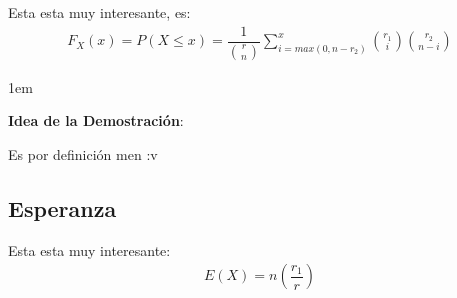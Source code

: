\documentclass[12pt, fleqn]{report}                             %
\newenvironment{SmallIndentation}[1][0.75em]                    %
        {\begin{adjustwidth}{#1}{}\begin{footnotesize}}             %
        {\end{footnotesize}\end{adjustwidth}}                       %
\theoremstyle{break}                                            %
\newcommand{\Wrap}[1]{\left( #1 \right)}                        %
\newcommand{\pfrac}[2]{\Wrap{\dfrac{#1}{#2}}}                   %
\begin{document}
                Esta esta muy interesante, es:
                \begin{align*}
                    F_X(x) 
                        = P(X \leq x)              
                        = \dfrac{1}{\binom{r}{n}}
                            \displaystyle \sum_{i = max (0, n - r_2)}^x                
                                \binom{r_1}{i} \binom{r_2}{n - i}
                \end{align*}

                \begin{SmallIndentation}[1em]
                    \textbf{Idea de la Demostración}:
                    
                    Es por definición men :v
                
                \end{SmallIndentation}
                    


            \clearpage
            \subsection{Esperanza}

                Esta esta muy interesante:
                \begin{align*}
                    E(X) = n \pfrac{r_1}{r}                    
                \end{align*}
\end{document}
